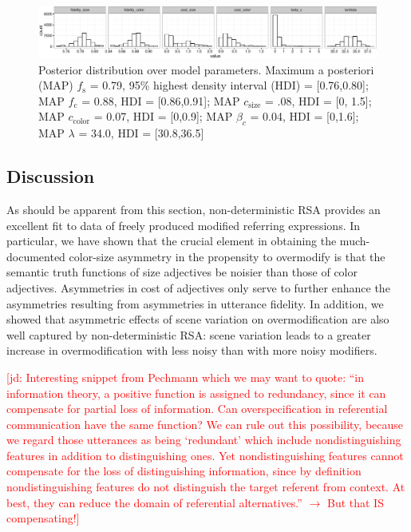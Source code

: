 \documentclass[11pt]{article}
\newcommand{\jd}[1]{\textcolor{Red}{[jd: #1]}}
\begin{document}
\begin{figure}
\centering
\includegraphics[width=\textwidth]{../../../models/1a_bda_basic/results_bda/graphs/parameterposteriors-fixed-reducedconditions-unlogged}
\caption{Posterior distribution over model parameters. Maximum a posteriori (MAP)  $f_{\textrm{s}}$ = 0.79, 95\% highest density interval (HDI) = [0.76,0.80]; MAP $f_{\textrm{c}}$ = 0.88, HDI = [0.86,0.91]; MAP $c_{\textrm{size}}$ = .08, HDI = [0, 1.5]; MAP $c_{\textrm{color}}$ = 0.07, HDI = [0,0.9]; MAP $\beta_c$ = 0.04, HDI = [0,1.6]; MAP $\lambda$ = 34.0, HDI = [30.8,36.5]}
\label{fig:modifierparamposteriors}
\end{figure}

\subsection{Discussion}
\label{sec:modifierdiscussion}

As should be apparent from this section, non-deterministic RSA provides an excellent fit to data of freely produced modified referring expressions. In particular, we have shown that the crucial element in obtaining the much-documented color-size asymmetry in the propensity to overmodify is that the semantic truth functions of size adjectives be noisier than those of color adjectives. Asymmetries in cost of adjectives  only serve to further enhance the asymmetries resulting from asymmetries in utterance fidelity. In addition, we showed that asymmetric effects of scene variation on overmodification are also well captured by non-deterministic RSA: scene variation leads to a greater increase in overmodification with less noisy than with more noisy modifiers.

\jd{Interesting snippet from Pechmann which we may want to quote: ``in information theory, a positive function is assigned to redundancy, since it can compensate for partial loss of information. Can overspecification in referential communication have the same function? We can rule out this possibility, because we regard those utterances as being `redundant' which include nondistinguishing features in addition to distinguishing ones. Yet nondistinguishing features cannot compensate for the loss of distinguishing information, since by definition nondistinguishing features do not distinguish the target referent from context. At best, they can reduce the domain of referential alternatives.'' $\rightarrow$ But that IS compensating!}
\end{document}
